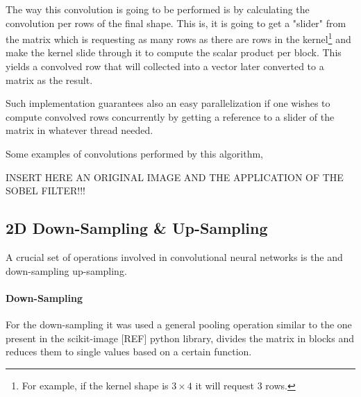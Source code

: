 The way this convolution is going to be performed is by calculating the convolution per rows of the final shape. This is, it is going to get a "slider" from the matrix which is requesting as many rows as there are rows in the kernel\footnote{For example, if the kernel shape is $ 3\times 4 $ it will request $ 3 $ rows.} and make the kernel slide through it to compute the scalar product per block. This yields a convolved row that will collected into a vector later converted to a matrix as the result.

Such implementation guarantees also an easy parallelization if one wishes to compute convolved rows concurrently by getting a reference to a slider of the matrix in whatever thread needed.

Some examples of convolutions performed by this algorithm,

INSERT HERE AN ORIGINAL IMAGE AND THE APPLICATION OF THE SOBEL FILTER!!!

\subsection{2D Down-Sampling \& Up-Sampling}

A crucial set of operations involved in convolutional neural networks is the and down-sampling up-sampling.

\paragraph{Down-Sampling}
For the down-sampling it was used a general pooling operation similar to the one present in the scikit-image [REF] python library, divides the matrix in blocks and reduces them to single values based on a certain function.

